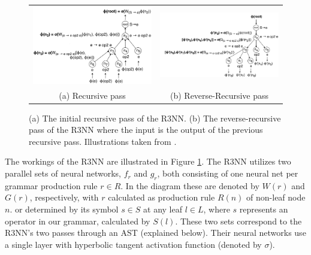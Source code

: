 \documentclass{article}
\begin{document}
\begin{figure}[h]
    \begin{tabular}{cc}
        \begin{minipage}{0.45\linewidth}
            \includegraphics[scale=0.16]{figures/tree2.png}
        \end{minipage}
        &
        \begin{minipage}{0.55\linewidth}
            \includegraphics[scale=0.16]{figures/tree3.png}
        \end{minipage}
        \\
        (a) Recursive pass & (b) Reverse-Recursive pass
    \end{tabular}
    \caption{(a) The initial recursive pass of the R3NN. (b) The reverse-recursive pass of the R3NN where the input is the output of the previous recursive pass. Illustrations taken from \citep{nsps}.}
    \label{r3nn}
\end{figure}

The workings of the R3NN are illustrated in Figure \ref{r3nn}.
The R3NN utilizes two parallel sets of neural networks, $f_r$ and $g_r$,
both consisting of one neural net per grammar production rule $r \in R$.
In the diagram these are denoted by $W(r)$ and $G(r)$, respectively,
with $r$ calculated as production rule $R(n)$ of non-leaf node $n$.
or determined by its symbol $s \in S$ at any leaf $l \in L$,
where $s$ represents an operator in our grammar, calculated by $S(l)$.
These two sets correspond to the R3NN's two passes through an AST (explained below).
Their neural networks use a single layer with hyperbolic tangent activation function (denoted by $\sigma$).
\end{document}
